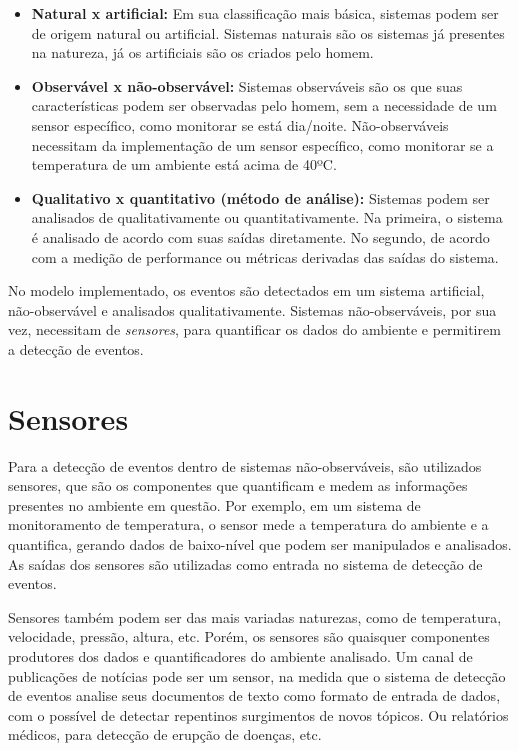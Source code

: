 \begin{itemize}
	\item \textbf{Natural x artificial:} Em sua classificação mais básica, sistemas podem ser de origem natural ou artificial. Sistemas naturais são os sistemas já presentes na natureza, já os artificiais são os criados pelo homem.
	\item \textbf{Observável x não-observável:} Sistemas observáveis são os que suas características podem ser observadas pelo homem, sem a necessidade de um sensor específico, como monitorar se está dia/noite. Não-observáveis necessitam da implementação de um sensor específico, como monitorar se a temperatura de um ambiente está acima de 40ºC.
	\item \textbf{Qualitativo x quantitativo (método de análise):} Sistemas podem ser analisados de qualitativamente ou quantitativamente. Na primeira, o sistema é analisado de acordo com suas saídas diretamente. No segundo, de acordo com a medição de performance ou métricas derivadas das saídas do sistema.
\end{itemize}

No modelo implementado, os eventos são detectados em um sistema artificial, não-observável e analisados qualitativamente. Sistemas não-observáveis, por sua vez, necessitam de \textit{sensores}, para quantificar os dados do ambiente e permitirem a detecção de eventos.

\section{Sensores}

Para a detecção de eventos dentro de sistemas não-observáveis, são utilizados sensores, que são os componentes que quantificam e medem as informações presentes no ambiente em questão. Por exemplo, em um sistema de monitoramento de temperatura, o sensor mede a temperatura do ambiente e a quantifica, gerando dados de baixo-nível que podem ser manipulados e analisados. As saídas dos sensores são utilizadas como entrada no sistema de detecção de eventos. 

Sensores também podem ser das mais variadas naturezas, como de temperatura, velocidade, pressão, altura, etc. Porém, os sensores são quaisquer componentes produtores dos dados e quantificadores do ambiente analisado. Um canal de publicações de notícias pode ser um sensor, na medida que o sistema de detecção de eventos analise seus documentos de texto como formato de entrada de dados, com o possível de detectar repentinos surgimentos de novos tópicos. Ou relatórios médicos, para detecção de erupção de doenças, etc.

